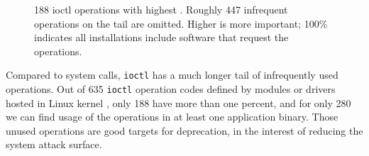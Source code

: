 




\begin{figure}[t]
\vspace{-0.1in}
\caption[\Usagemetric{} of common {\tt ioctl} opcodes]
{188 {ioctl} operations with highest \usagemetric{}.  Roughly 447 infrequent operations on the tail are omitted. Higher is more important; 100\% indicates all installations include software that request the operations.}
\label{fig:ioctl-popularity}
\end{figure}

Compared to system calls, 
{\tt ioctl} has a much longer tail of infrequently used operations.
Out of 635 {\tt ioctl} operation codes defined by modules or drivers hosted in Linux kernel ,
only 188 have \usagemetric{} more than one percent,
and for only 280 we can find usage of the operations in at least one application binary.
Those unused operations are good targets for deprecation, in the interest
of reducing the system attack surface.

